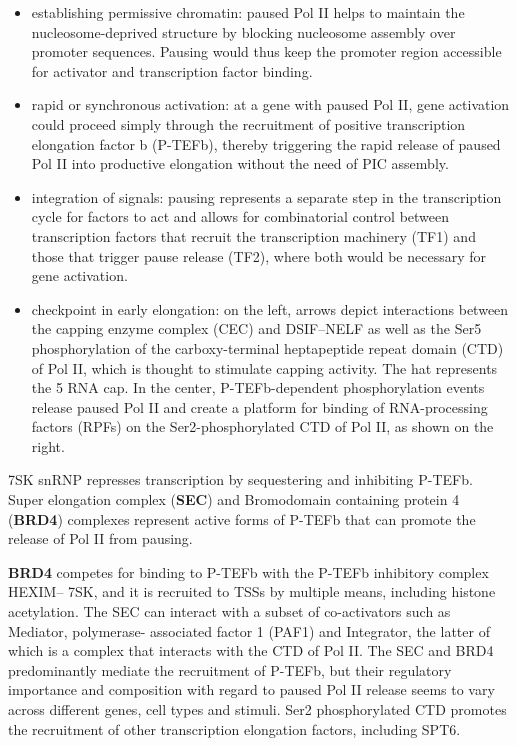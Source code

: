 \begin{itemize}
\tightlist
\item
  establishing permissive chromatin: paused Pol II helps to maintain the nucleosome-deprived structure by blocking nucleosome assembly over promoter sequences. Pausing would thus keep the promoter region accessible for activator and transcription factor binding.
\item
  rapid or synchronous activation: at a gene with paused Pol II, gene activation could proceed simply through the recruitment of positive transcription elongation factor b (P-TEFb), thereby triggering the rapid release of paused Pol II into productive elongation without the need of PIC assembly.
\item
  integration of signals: pausing represents a separate step in the transcription cycle for factors to act and allows for combinatorial control between transcription factors that recruit the transcription machinery (TF1) and those that trigger pause release (TF2), where both would be necessary for gene activation.
\item
  checkpoint in early elongation: on the left, arrows depict interactions between the capping enzyme complex (CEC) and DSIF--NELF as well as the Ser5 phosphorylation of the carboxy-terminal heptapeptide repeat domain (CTD) of Pol II, which is thought to stimulate capping activity. The hat represents the 5 RNA cap. In the center, P-TEFb-dependent phosphorylation events release paused Pol II and create a platform for binding of RNA-processing factors (RPFs) on the Ser2-phosphorylated CTD of Pol II, as shown on the right.
\end{itemize}

7SK snRNP represses transcription by sequestering and inhibiting P-TEFb. Super elongation complex (\textbf{SEC}) and Bromodomain containing protein 4 (\textbf{BRD4}) complexes represent active forms of P-TEFb that can promote the release of Pol II from pausing.

\textbf{BRD4} competes for binding to P-TEFb with the P-TEFb inhibitory complex HEXIM-- 7SK, and it is recruited to TSSs by multiple means, including histone acetylation. The SEC can interact with a subset of co-activators such as Mediator, polymerase- associated factor 1 (PAF1) and Integrator, the latter of which is a complex that interacts with the CTD of Pol II. The SEC and BRD4 predominantly mediate the recruitment of P-TEFb, but their regulatory importance and composition with regard to paused Pol II release seems to vary across different genes, cell types and stimuli. Ser2 phosphorylated CTD promotes the recruitment of other transcription elongation factors, including SPT6.


